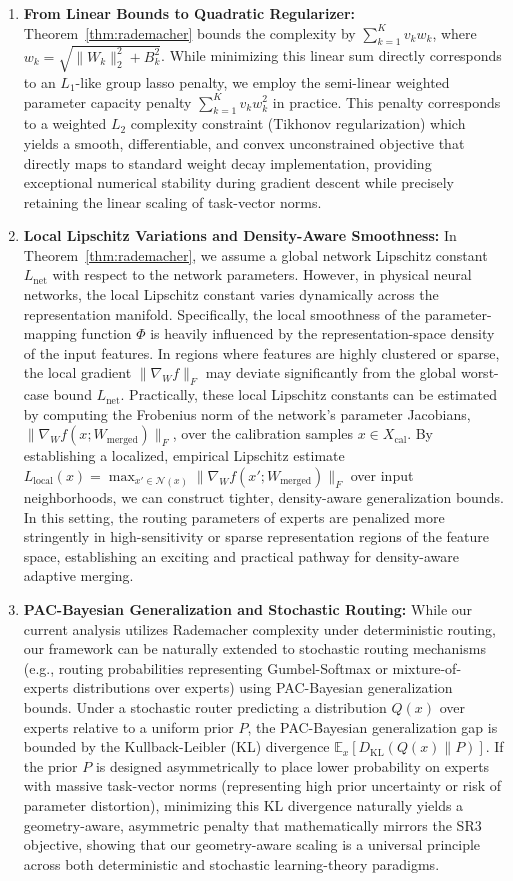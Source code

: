 \begin{enumerate}
    \item \textbf{From Linear Bounds to Quadratic Regularizer:} Theorem~\ref{thm:rademacher} bounds the complexity by $\sum_{k=1}^K v_k w_k$, where $w_k = \sqrt{\|W_k\|_2^2 + B_k^2}$. While minimizing this linear sum directly corresponds to an $L_1$-like group lasso penalty, we employ the semi-linear weighted parameter capacity penalty $\sum_{k=1}^K v_k w_k^2$ in practice. This penalty corresponds to a weighted $L_2$ complexity constraint (Tikhonov regularization) which yields a smooth, differentiable, and convex unconstrained objective that directly maps to standard weight decay implementation, providing exceptional numerical stability during gradient descent while precisely retaining the linear scaling of task-vector norms.
    \item \textbf{Local Lipschitz Variations and Density-Aware Smoothness:} In Theorem~\ref{thm:rademacher}, we assume a global network Lipschitz constant $L_{\text{net}}$ with respect to the network parameters. However, in physical neural networks, the local Lipschitz constant varies dynamically across the representation manifold. Specifically, the local smoothness of the parameter-mapping function $\Phi$ is heavily influenced by the representation-space density of the input features. In regions where features are highly clustered or sparse, the local gradient $\|\nabla_W f\|_F$ may deviate significantly from the global worst-case bound $L_{\text{net}}$. Practically, these local Lipschitz constants can be estimated by computing the Frobenius norm of the network's parameter Jacobians, $\|\nabla_W f(x; W_{\text{merged}})\|_F$, over the calibration samples $x \in X_{\text{cal}}$. By establishing a localized, empirical Lipschitz estimate $L_{\text{local}}(x) = \max_{x' \in \mathcal{N}(x)} \|\nabla_W f(x'; W_{\text{merged}})\|_F$ over input neighborhoods, we can construct tighter, density-aware generalization bounds. In this setting, the routing parameters of experts are penalized more stringently in high-sensitivity or sparse representation regions of the feature space, establishing an exciting and practical pathway for density-aware adaptive merging.
    \item \textbf{PAC-Bayesian Generalization and Stochastic Routing:} While our current analysis utilizes Rademacher complexity under deterministic routing, our framework can be naturally extended to stochastic routing mechanisms (e.g., routing probabilities representing Gumbel-Softmax or mixture-of-experts distributions over experts) using PAC-Bayesian generalization bounds. Under a stochastic router predicting a distribution $Q(x)$ over experts relative to a uniform prior $P$, the PAC-Bayesian generalization gap is bounded by the Kullback-Leibler (KL) divergence $\mathbb{E}_{x}[D_{\text{KL}}(Q(x) \| P)]$. If the prior $P$ is designed asymmetrically to place lower probability on experts with massive task-vector norms (representing high prior uncertainty or risk of parameter distortion), minimizing this KL divergence naturally yields a geometry-aware, asymmetric penalty that mathematically mirrors the SR3 objective, showing that our geometry-aware scaling is a universal principle across both deterministic and stochastic learning-theory paradigms.

\end{enumerate}
